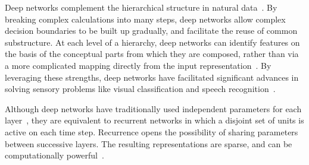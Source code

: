 \documentclass{article} %
\begin{document}
\begin{comment}
In this paper, we show that discriminative fine-tuning of a recurrent sparse autoencoder %
does not just discover ``parts'' that are more discriminative.  Rather, a hierarchical representation naturally emerges from a homogeneous pool of hidden units, with global template categorical-units slowly integrating %
over local part-units. %
In contrast to traditional highly-overcomplete sparse coding but consistent with the globally nonlinear nature of the data manifold, the part-units of discriminative recurrent sparse autoencoders are only compatible with a subset of the categorical-units.
Even discriminative recurrent sparse autoencoders with very few hidden units achieve impressive categorization performance when trained in this manner.
\end{comment}


Deep networks complement the hierarchical structure in natural data~\citep{bengio2009}.  
By breaking complex calculations into many steps, deep networks allow complex decision boundaries to be built up gradually, and facilitate the reuse of common substructure.  
At each level of a hierarchy, deep networks can identify features on the basis of the conceptual parts from which they are composed, rather than via a more complicated mapping directly from the input representation~\citep{lee2008, zeiler2011}.  %
By leveraging these strengths, deep networks have facilitated significant advances in solving sensory problems like visual classification and speech recognition~\citep{hinton2006, dahl2012}.  

Although deep networks have traditionally used independent parameters for each layer~\citep{hinton2006}, they are equivalent to recurrent networks in which a disjoint set of units is active on each time step.  
Recurrence opens the possibility of sharing parameters between successive layers.
The resulting representations are sparse, and can be computationally powerful~\citep{mairal2012}.
\end{document}
